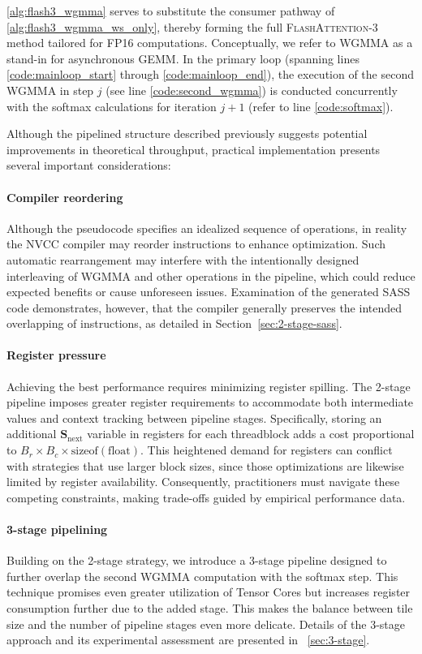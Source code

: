 \cref{alg:flash3_wgmma} serves to substitute the consumer pathway of \cref{alg:flash3_wgmma_ws_only}, thereby forming the full \textsc{FlashAttention-3} method tailored for FP16 computations. Conceptually, we refer to WGMMA as a stand-in for asynchronous GEMM. In the primary loop (spanning lines \ref{code:mainloop_start} through \ref{code:mainloop_end}), the execution of the second WGMMA in step $j$ (see line \ref{code:second_wgmma}) is conducted concurrently with the softmax calculations for iteration $j+1$ (refer to line \ref{code:softmax}).

Although the pipelined structure described previously suggests potential improvements in theoretical throughput, practical implementation presents several important considerations:

\paragraph{Compiler reordering} Although the pseudocode specifies an idealized sequence of operations, in reality the NVCC compiler may reorder instructions to enhance optimization. Such automatic rearrangement may interfere with the intentionally designed interleaving of WGMMA and other operations in the pipeline, which could reduce expected benefits or cause unforeseen issues. Examination of the generated SASS code demonstrates, however, that the compiler generally preserves the intended overlapping of instructions, as detailed in Section~\ref{sec:2-stage-sass}.

\paragraph{Register pressure} Achieving the best performance requires minimizing register spilling. The 2-stage pipeline imposes greater register requirements to accommodate both intermediate values and context tracking between pipeline stages. Specifically, storing an additional $\mathbf{S}_{\mathrm{next}}$ variable in registers for each threadblock adds a cost proportional to $B_r \times B_c \times \text{sizeof}(\text{float})$. This heightened demand for registers can conflict with strategies that use larger block sizes, since those optimizations are likewise limited by register availability. Consequently, practitioners must navigate these competing constraints, making trade-offs guided by empirical performance data.

\paragraph{3-stage pipelining} Building on the 2-stage strategy, we introduce a 3-stage pipeline designed to further overlap the second WGMMA computation with the softmax step. This technique promises even greater utilization of Tensor Cores but increases register consumption further due to the added stage. This makes the balance between tile size and the number of pipeline stages even more delicate. Details of the 3-stage approach and its experimental assessment are presented in ~\cref{sec:3-stage}.

